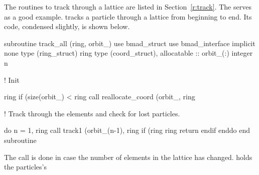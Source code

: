The routines to track through a lattice are listed in Section~\ref{r:track}.
The  serves as a good example.  tracks a particle
through a lattice from beginning to end. Its code, condensed slightly, 
is shown below.
\begin{example}
subroutine track_all (ring, orbit_)
  use bmad_struct
  use bmad_interface
  implicit none
  type (ring_struct)  ring
  type (coord_struct), allocatable :: orbit_(:)
  integer n

! Init

  ring%
  if (size(orbit_) < ring%
                  call reallocate_coord (orbit_, ring%

! Track through the elements and check for lost particles.

  do n = 1, ring%
    call track1 (orbit_(n-1), ring%
    if (ring%
      ring%
      return
    endif
  enddo
end subroutine
\end{example}
The  call is done in case the number of elements
in the lattice has changed.  holds the particles's
